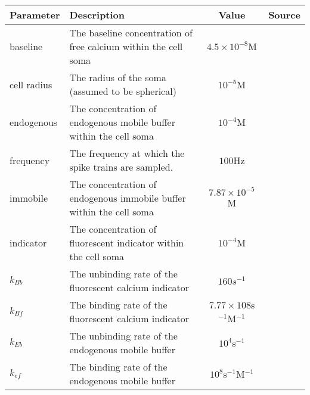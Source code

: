 \documentclass[a4paper,12pt]{article}
\theoremstyle{definition}
\begin{document}
\begin{table}
    \centering
    \begin{tabular}[t]{|l|p{6cm}|c|c|}
        \hline
        \textbf{Parameter}  & \textbf{Description}                                                                      & \textbf{Value}                        & \textbf{Source} \\ \hline
        baseline            & The baseline concentration of free calcium within the cell soma                           & $4.5 \times 10^{−8}$M                 & \cite{maravall} \\ \hline
        cell radius         & The radius of the soma (assumed to be spherical)                                          & $10^{-5}$M                            & \cite{fiala} \\ \hline
        endogenous         & The concentration of endogenous mobile buffer within the cell soma                       & $10^{-4}$M                            & \cite{faas} \\ \hline
        frequency           & The frequency at which the spike trains are sampled.                                      & $100$Hz                               & \\ \hline
        immobile            & The concentration of endogenous immobile buffer within the cell soma                     & $7.87 \times 10^{-5}$M                & \cite{bartol} \\ \hline
        indicator           & The concentration of fluorescent indicator within the cell soma                           & $10^{-4}$M                            & \cite{maravall} \\ \hline
        $k_{Bb}$            & The unbinding rate of the fluorescent calcium indicator                                   & $160s^{−1}$                           & \cite{bartol} \\ \hline
        $k_{Bf}$            & The binding rate of the fluorescent calcium indicator                                     & $7.77 \times 108$s$^{−1}$M$^{−1}$     & \cite{bartol} \\ \hline
        $k_{Eb}$            & The unbinding rate of the endogenous mobile buffer                                       & $10^4$s$^{-1}$                        & \cite{bartol} \\ \hline
        $k_{ef}$            & The binding rate of the endogenous mobile buffer                                         & $10^8$s$^{-1}$M$^{-1}$                & \cite{bartol} \\ \hline

\end{tabular}
\end{table}
\end{document}
